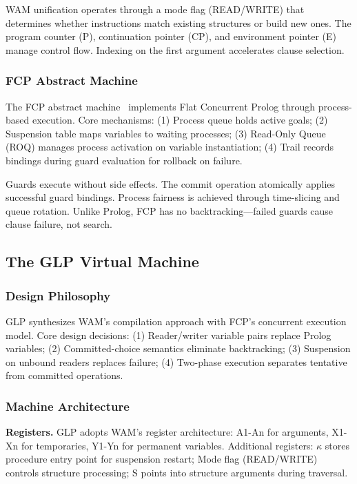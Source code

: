 \documentclass[runningheads,thm-restate]{llncs}
\newcommand{\mypara}[1]{\smallskip\noindent\textbf{#1.}}
\begin{document}
WAM unification operates through a mode flag (READ/WRITE) that determines whether instructions match existing structures or build new ones. The program counter (P), continuation pointer (CP), and environment pointer (E) manage control flow. Indexing on the first argument accelerates clause selection.

\subsubsection{FCP Abstract Machine}

The FCP abstract machine~\cite{houri1989sequential} implements Flat Concurrent Prolog through process-based execution. Core mechanisms: (1) Process queue holds active goals; (2) Suspension table maps variables to waiting processes; (3) Read-Only Queue (ROQ) manages process activation on variable instantiation; (4) Trail records bindings during guard evaluation for rollback on failure.

Guards execute without side effects. The commit operation atomically applies successful guard bindings. Process fairness is achieved through time-slicing and queue rotation. Unlike Prolog, FCP has no backtracking—failed guards cause clause failure, not search.

\subsection{The GLP Virtual Machine}

\subsubsection{Design Philosophy}

GLP synthesizes WAM's compilation approach with FCP's concurrent execution model. Core design decisions: (1) Reader/writer variable pairs replace Prolog variables; (2) Committed-choice semantics eliminate backtracking; (3) Suspension on unbound readers replaces failure; (4) Two-phase execution separates tentative from committed operations.

\subsubsection{Machine Architecture}

\mypara{Registers}
GLP adopts WAM's register architecture: A1-An for arguments, X1-Xn for temporaries, Y1-Yn for permanent variables. Additional registers: $\kappa$ stores procedure entry point for suspension restart; Mode flag (READ/WRITE) controls structure processing; S points into structure arguments during traversal.
\end{document}
